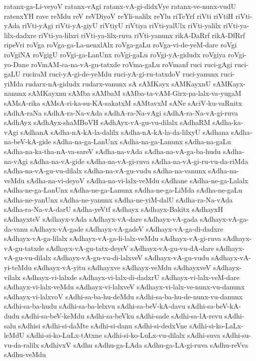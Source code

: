 {ratanx-ga-Li-veyoV
ratanx-vAgi
ratanx-vA-gi-didxVye
ratanx-ve-nunx-vudU
ratenxYH
rave
reMdu
reV
reVDiyoV
reYli-nalilx
reYlu
riTeYrf
riVti
riVtiH
riVti-yAda
riVti-yAgi
riVti-yA-giyU
riVtiyU
riVtiya
riVti-yalUlx
riVti-yalilx
riVti-ya-lilx-dadxre
riVti-ya-lilxri
riVti-ya-lilx-ruva
riVti-yanunx
rikA-DaRrf
rikA-DfRrf
ripeVri
roVga
roVga-ga-La-nenxlAlx
roVga-gaLu
roVga-vi-de-yeM-dare
roVgi
roVgiNA
roVgigU
roVgi-ga-LanUnx
roVgi-gaLu
roVgi-yA-gidudx
roVgiya
roVgi-yo-Dane
roVmAM-ca-na-vA-gu-tatxde
roVma-gaLu
roVmanf
ruci
ruci-gAgi
ruci-gaLU
ruciraM
ruci-yA-gi-de-yeMdu
ruci-yA-gi-ru-tatxdoV
ruci-yanunx
ruci-yiMda
rudarx-nA-gidudx
rudarx-vanunx
sA
sAMKayx
sAMKayxnU
sAMKayx-nanunx
sAMKayxnu
sAMba
sAMbaM
sAMba-ta-vAM-Girx-pa-lalx-va-yugaM
sAMsA-rika
sAMsA-ri-ka-su-KA-sakatxM
sAMtavxM
sANe
sAciV-ku-vaRnitx
sAdhA-raNa
sAdhA-ra-Na-vAda
sAdhA-ra-Na-vAgi
sAdhA-ra-Na-vA-gi-ruva
sAdhAyx
sAdhAyx-shaMBoVH
sAdhAyx-vA-gu-vu-dilalx
sAdhaRM
sAdha-ka-vAgi
sAdhanA
sAdha-nA-kA-la-dalilx
sAdha-nA-kA-la-da-lilxyU
sAdhana
sAdha-na-beV-kA-gide
sAdha-na-ga-LanUnx
sAdha-na-ga-Lanunx
sAdha-na-gaLu
sAdha-na-ka-tha-nA-va-sareV
sAdha-na-vAda
sAdha-na-vA-ga-ba-hudu
sAdha-na-vAgi
sAdha-na-vA-gide
sAdha-na-vA-gi-ruva
sAdha-na-vA-gi-ru-vu-da-riMda
sAdha-na-vA-gu-vu-dilalx
sAdha-na-vA-gu-vudu
sAdha-na-vanunx
sAdha-na-veMdu
sAdha-na-vi-deyoV
sAdha-na-vi-lalx-veMdu
sAdhane
sAdha-ne-ga-Lalalx
sAdha-ne-ga-LanUnx
sAdha-ne-ga-Lanunx
sAdha-ne-ga-LiMda
sAdha-ne-gaLu
sAdha-ne-yanUnx
sAdha-ne-yanunx
sAdha-ne-yiM-dalU
sAdha-ra-Na-vAda
sAdha-ra-Na-vA-darU
sAdha-yeVtf
sAdhayx
sAdhayx-Bakitx
sAdhayxH
sAdhayxteV
sAdhayx-vAda
sAdhayx-vA-dare
sAdhayx-vA-gada
sAdhayx-vA-ga-da-vanu
sAdhayx-vA-gade
sAdhayx-vA-gadeV
sAdhayx-vA-ga-di-dadxre
sAdhayx-vA-ga-lilalx
sAdhayx-vA-ga-li-lalx-veMdu
sAdhayx-vA-gi-ruva
sAdhayx-vA-gu-tatxde
sAdhayx-vA-gu-tatx-deyeV
sAdhayx-vA-gu-vu-dA-dare
sAdhayx-vA-gu-vu-dilalx
sAdhayx-vA-gu-vu-di-lalxveV
sAdhayx-vA-gu-vudu
sAdhayx-vA-yi-teMdu
sAdhayx-vA-yitu
sAdhayxve
sAdhayx-veMdu
sAdhayxveV
sAdhayx-vilalx
sAdhayx-vi-lalxde
sAdhayx-vi-lalx-di-dadxrU
sAdhayx-vi-lalx-veM-dare
sAdhayx-vi-lalx-veMdu
sAdhayx-vi-lalxveV
sAdhayx-vi-lalx-ve-nunx-vu-danunx
sAdhayx-vi-lalxvoV
sAdhi-sa-ba-hu-deMdu
sAdhi-sa-ba-hu-de-nunx-vu-danunx
sAdhi-sa-ba-hudu
sAdhi-sa-ba-lelxvu
sAdhi-sa-beV-kA-davu
sAdhi-sa-beV-kA-dudu
sAdhi-sa-beV-keMdu
sAdhi-sa-beVku
sAdhi-sade
sAdhi-sa-lA-revu
sAdhi-salu
sAdhisi
sAdhi-si-daMte
sAdhi-si-danu
sAdhi-si-dedxVne
sAdhi-si-ko-LaLx-leMdU
sAdhi-si-ko-LuLx-tAtxne
sAdhi-si-ko-LuLx-vu-dilalx
sAdhi-suva
sAdhi-su-vu-da-ralilx
sAdhivxV
sAdhu
sAdhu-ga-LAda
sAdhu-ga-LA-gi-ruva
sAdhu-reVva
sAdhu-veMdu
}
